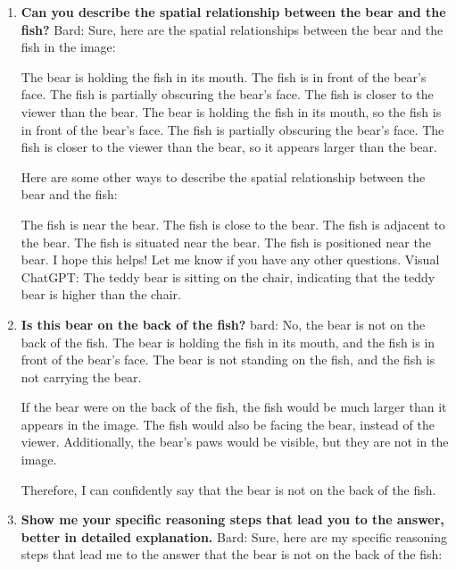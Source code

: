     \begin{enumerate}
        \item \textbf{Can you describe the spatial relationship between the bear and the fish?}
        \subitem Bard:
        Sure, here are the spatial relationships between the bear and the fish in the image:

        The bear is holding the fish in its mouth.
        The fish is in front of the bear's face.
        The fish is partially obscuring the bear's face.
        The fish is closer to the viewer than the bear.
        The bear is holding the fish in its mouth, so the fish is in front of the bear's face. The fish is partially obscuring the bear's face. The fish is closer to the viewer than the bear, so it appears larger than the bear.

        Here are some other ways to describe the spatial relationship between the bear and the fish:

        The fish is near the bear.
        The fish is close to the bear.
        The fish is adjacent to the bear.
        The fish is situated near the bear.
        The fish is positioned near the bear.
        I hope this helps! Let me know if you have any other questions.
        \subitem Visual ChatGPT: The teddy bear is sitting on the chair, indicating that the teddy bear is higher than the chair.
        \item \textbf{Is this bear on the back of the fish?}
        \subitem bard:
        No, the bear is not on the back of the fish. The bear is holding the fish in its mouth, and the fish is in front of the bear's face. The bear is not standing on the fish, and the fish is not carrying the bear.
        
        If the bear were on the back of the fish, the fish would be much larger than it appears in the image. The fish would also be facing the bear, instead of the viewer. Additionally, the bear's paws would be visible, but they are not in the image.
        
        Therefore, I can confidently say that the bear is not on the back of the fish.
        \item \textbf{Show me your specific reasoning steps that lead you to the answer, better in detailed explanation.}
        \subitem Bard:
        Sure, here are my specific reasoning steps that lead me to the answer that the bear is not on the back of the fish:
        

\end{enumerate}
